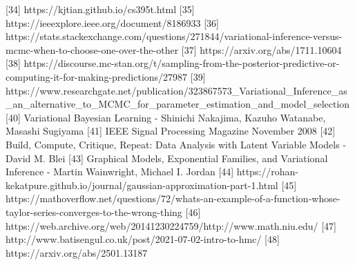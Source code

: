 [34] https://kjtian.github.io/cs395t.html
[35] https://ieeexplore.ieee.org/document/8186933
[36] https://stats.stackexchange.com/questions/271844/variational-inference-versus-mcmc-when-to-choose-one-over-the-other
[37] https://arxiv.org/abs/1711.10604
[38] https://discourse.mc-stan.org/t/sampling-from-the-posterior-predictive-or-computing-it-for-making-predictions/27987
[39] https://www.researchgate.net/publication/323867573_Variational_Inference_as_an_alternative_to_MCMC_for_parameter_estimation_and_model_selection
[40] Variational Bayesian Learning - Shinichi Nakajima, Kazuho Watanabe, Masashi Sugiyama
[41] IEEE Signal Processing Magazine November 2008
[42] Build, Compute, Critique, Repeat: Data Analysis with Latent Variable Models - David M. Blei
[43] Graphical Models, Exponential Families, and Variational Inference - Martin Wainwright, Michael I. Jordan
[44] https://rohan-kekatpure.github.io/journal/gaussian-approximation-part-1.html
[45] https://mathoverflow.net/questions/72/whats-an-example-of-a-function-whose-taylor-series-converges-to-the-wrong-thing
[46] https://web.archive.org/web/20141230224759/http://www.math.niu.edu/%
[47] http://www.batisengul.co.uk/post/2021-07-02-intro-to-hmc/
[48] https://arxiv.org/abs/2501.13187